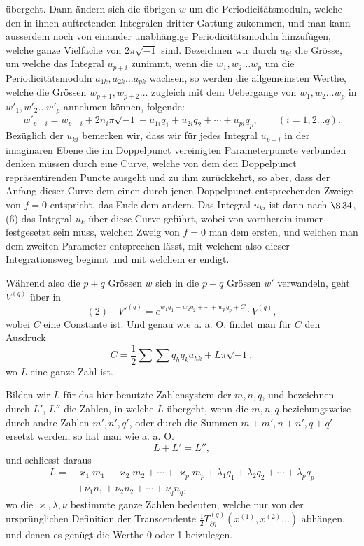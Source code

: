 \documentclass[10pt]{article}
\begin{document}
übergeht. Dann ändern sich die übrigen \(w\) um die Periodicitätsmoduln, welche den in ihnen auftretenden Integralen dritter Gattung zukommen, und man kann ausserdem noch von einander unabhängige Periodicitätsmoduln hinzufügen, welche ganze Vielfache von \(2\pi\sqrt{-1}\) sind. Bezeichnen wir durch \(u_{ki}\) die Grösse, um welche das Integral \(u_{p+i}\) zunimmt, wenn die \(w_1,w_2\ldots w_p\) um die Periodicitätsmoduln \(a_{1k},a_{2k}\ldots a_{pk}\) wachsen, so werden die allgemeinsten Werthe, welche die Grössen \(w_{p+1},w_{p+2}\ldots\) zugleich mit dem Uebergange von \(w_1,w_2\ldots w_p\) in \(w'_1,w'_2\ldots w'_p\) annehmen können, folgende:
\[
w'_{p+i}=w_{p+i}+2n_i\pi\sqrt{-1}+u_{1i}q_1+u_{2i}q_2+\cdots+u_{pi}q_p,
\qquad (i=1,2\ldots q).
\]
Bezüglich der \(u_{ki}\) bemerken wir, dass wir für jedes Integral \(u_{p+i}\) in der imaginären Ebene die im Doppelpunct vereinigten Parameterpuncte verbunden denken müssen durch eine Curve, welche von dem den Doppelpunct repräsentirenden Puncte ausgeht und zu ihm zurückkehrt, so aber, dass der Anfang dieser Curve dem einen durch jenen Doppelpunct entsprechenden Zweige von \(f=0\) entspricht, das Ende dem andern. Das Integral \(u_{ki}\) ist dann nach \(\S\,34\), (6) das Integral \(u_k\) über diese Curve geführt, wobei von vornherein immer festgesetzt sein muss, welchen Zweig von \(f=0\) man dem ersten, und welchen man dem zweiten Parameter entsprechen lässt, mit welchem also dieser Integrationsweg beginnt und mit welchem er endigt.

Während also die \(p+q\) Grössen \(w\) sich in die \(p+q\) Grössen \(w'\) verwandeln, geht \(V^{(q)}\) über in
\[
(2)\quad
V'^{(q)}=e^{w_1q_1+w_2q_2+\cdots+w_pq_p+C}\cdot V^{(q)},
\]
wobei \(C\) eine Constante ist. Und genau wie a. a. O. findet man für \(C\) den Ausdruck
\[
C=\frac12\sum\sum q_hq_ka_{hk}+L\pi\sqrt{-1},
\]
wo \(L\) eine ganze Zahl ist.

Bilden wir \(L\) für das hier benutzte Zahlensystem der \(m,n,q\), und bezeichnen durch \(L'\), \(L''\) die Zahlen, in welche \(L\) übergeht, wenn die \(m,n,q\) beziehungsweise durch andre Zahlen \(m',n',q'\), oder durch die Summen \(m+m',n+n',q+q'\) ersetzt werden, so hat man wie a. a. O.
\[
L+L'=L'',
\]
und schliesst daraus
\[
\begin{aligned}
L={}&\varkappa_1m_1+\varkappa_2m_2+\cdots+\varkappa_pm_p
+\lambda_1q_1+\lambda_2q_2+\cdots+\lambda_pq_p\\
&+\nu_1n_1+\nu_2n_2+\cdots+\nu_qn_q,
\end{aligned}
\]
wo die \(\varkappa,\lambda,\nu\) bestimmte ganze Zahlen bedeuten, welche nur von der ursprünglichen Definition der Transcendente \(\frac12T_{\xi\eta}^{(q)}(x^{(1)},x^{(2)}\ldots)\) abhängen, und denen es genügt die Werthe 0 oder 1 beizulegen.
\end{document}
